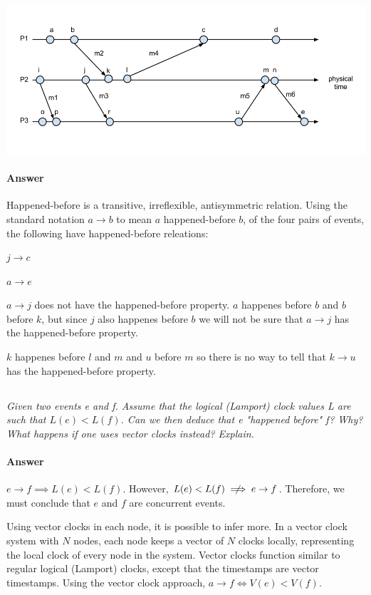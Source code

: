 \documentclass{article}
\newcommand{\question}[1]{\subsection{}\textit{#1}\bigskip}
\newcommand{\answer}{\paragraph{Answer}}
\begin{document}
\includegraphics[width=\textwidth]{images/T3-1.png}

\answer
Happened-before is a transitive, irreflexible, antisymmetric relation.
Using the standard notation $ a \rightarrow b $ to mean $ a $ happened-before $ b$, of the four pairs of events, the following have happened-before releations:

\begin{itemize}
\begin{centering}
    \item{$ j \rightarrow c $}
    \item{$ a \rightarrow e $}
    \\
\end{centering}
\end{itemize}

$ a \rightarrow j $ does not have the happened-before property. $a$ happenes before $b$ and $b$ before $k$, but since $j$ also happenes before $b$ we will not be sure that $a \rightarrow j$ has the happened-before property.

$k$ happenes before $l$ and $m$ and $u$ before $m$ so there is no way to tell that $k \rightarrow u$ has the happened-before property.

\question{Given two events e and f. Assume that the logical (Lamport) clock values L are such that $L (e) < L (f)$. Can we then deduce that e "happened before" f? Why? What happens if one uses vector clocks instead? Explain.}

\answer
$ e \rightarrow f \implies L(e) < L(f) $. However, $ L(e) < L(f) \centernot\implies e \rightarrow f $.
Therefore, we must conclude that $ e $ and $ f $ are concurrent events.

Using vector clocks in each node, it is possible to infer more.
In a vector clock system with $ N $ nodes, each node keeps a vector of $ N $ clocks locally, representing the local clock of every node in the system.
Vector clocks function similar to regular logical (Lamport) clocks, except that the timestamps are vector timestamps.
Using the vector clock approach, $ a \rightarrow f \iff V(e) < V(f) $.
\end{document}
